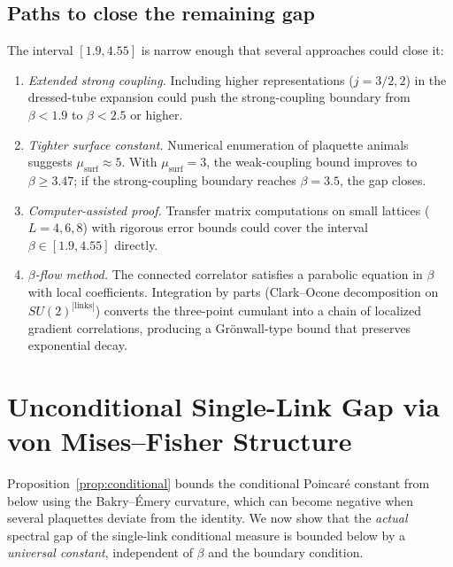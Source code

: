 \documentclass[11pt,a4paper]{article}
\theoremstyle{plain}
\theoremstyle{definition}
\theoremstyle{remark}
\begin{document}
\subsection*{Paths to close the remaining gap}

The interval $[1.9, 4.55]$ is narrow enough that several
approaches could close it:

\begin{enumerate}[label=(\alph*)]
\item \emph{Extended strong coupling.}
  Including higher representations ($j = 3/2, 2$) in the
  dressed-tube expansion could push the strong-coupling boundary
  from $\beta < 1.9$ to $\beta < 2.5$ or higher.

\item \emph{Tighter surface constant.}
  Numerical enumeration of plaquette animals suggests
  $\mu_{\mathrm{surf}} \approx 5$.
  With $\mu_{\mathrm{surf}} = 3$, the weak-coupling bound
  improves to $\beta \geq 3.47$; if the strong-coupling
  boundary reaches $\beta = 3.5$, the gap closes.

\item \emph{Computer-assisted proof.}
  Transfer matrix computations on small lattices ($L = 4, 6, 8$)
  with rigorous error bounds could cover the interval
  $\beta \in [1.9, 4.55]$ directly.

\item \emph{$\beta$-flow method.}
  The connected correlator satisfies a parabolic equation in
  $\beta$ with local coefficients.
  Integration by parts (Clark--Ocone decomposition on
  $SU(2)^{|\mathrm{links}|}$) converts the three-point
  cumulant into a chain of localized gradient correlations,
  producing a Gr\"onwall-type bound that preserves exponential
  decay.
\end{enumerate}


\section{Unconditional Single-Link Gap via von Mises--Fisher Structure}%
\label{sec:vmf}

Proposition~\ref{prop:conditional} bounds the conditional Poincar\'e
constant from below using the Bakry--\'Emery curvature, which can
become negative when several plaquettes deviate from the identity.
We now show that the \emph{actual} spectral gap of the single-link
conditional measure is bounded below by a \emph{universal constant},
independent of $\beta$ and the boundary condition.
\end{document}
